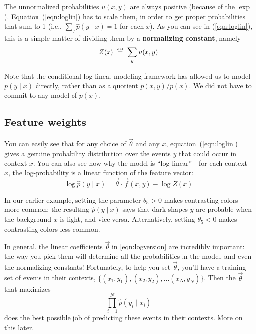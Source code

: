 \documentclass[11pt]{article}
\newcommand{\defeq}{\;\stackrel{\mbox{\tiny def}}{=}\;}
\newcommand{\vtheta}{\vec{\theta}}
\newcommand{\ph}{\hat{p}}
\begin{document}
The unnormalized probabilities $u(x,y)$ are always positive (because
of the $\exp$).  Equation~(\ref{eqn:loglin}) has to scale them, in
order to get proper probabilities that sum to 1 (i.e., $\sum_y
\ph(y\mid x) = 1$ for each $x$).  As you can see in
(\ref{eqn:loglin}), this is a simple matter of dividing them by a {\bf
  normalizing constant}, namely
\begin{equation}
  Z(x) \defeq \sum_y u(x,y)
\end{equation}

Note that the conditional log-linear modeling framework has allowed us
to model $p(y \mid x)$ directly, rather than as a quotient $p(x,y) /
p(x)$.  We did not have to commit to any model of $p(x)$.

\subsection{Feature weights}

You can easily see that for any choice of $\vtheta$ and any $x$,
equation~(\ref{eqn:loglin}) gives a genuine probability distribution
over the events $y$ that could occur in context $x$.  You can also see
now why the model is ``log-linear''---for each context $x$, the
log-probability is a linear function of the feature vector:
\begin{equation}\label{eqn:logversion}
\log \ph(y \mid x) = \vtheta \cdot \vec{f}(x,y) - \log Z(x)
\end{equation}


In our earlier example, setting the parameter $\theta_5 > 0$ makes
contrasting colors more common: the resulting $\ph(y \mid x)$ says
that dark shapes $y$ are probable when the background $x$ is light,
and vice-versa.  Alternatively, setting $\theta_5 < 0$ makes
contrasting colors less common.

In general, the linear coefficients $\vtheta$ in \eqref{eqn:logversion} are incredibly
important: the way you pick them will determine all the probabilities
in the model, and even the normalizing constants!  Fortunately, to
help you set $\vtheta$, you'll have a training set of events in their
contexts, $\{(x_1,y_1), (x_2,y_2), \ldots (x_N,y_N)\}$.  Then the
$\vtheta$ that maximizes
\begin{equation}\label{eqn:loglin-likelihood}
\prod_{i=1}^N \ph(y_i \mid x_i)
\end{equation}
does the best possible job of predicting these events in their
contexts.  More on this later.
\end{document}
